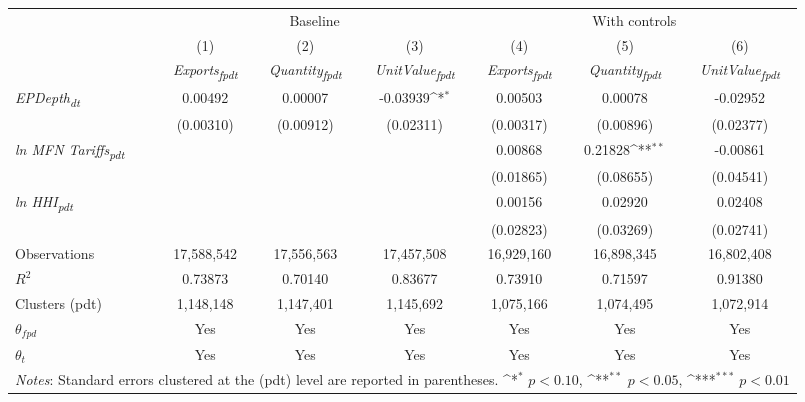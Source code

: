 {
\def\sym#1{\ifmmode^{#1}\else\(^{#1}\)\fi}
\begin{tabular}{l*{6}{c}}
\toprule
&\multicolumn{3}{c}{Baseline}&\multicolumn{3}{c}{With controls}\\\cmidrule(lr){2-4}\cmidrule(lr){5-7}
&(1)&(2)&(3)&(4)&(5)&(6)\\
&\textit{Exports\textsubscript{fpdt}}&\textit{Quantity\textsubscript{fpdt}}&\textit{UnitValue\textsubscript{fpdt}}&\textit{Exports\textsubscript{fpdt}}&\textit{Quantity\textsubscript{fpdt}}&\textit{UnitValue\textsubscript{fpdt}}\\
\midrule
\textit{EPDepth\textsubscript{dt}} & 0.00492 & 0.00007 & -0.03939\sym{*} & 0.00503 & 0.00078 & -0.02952\\
 & (0.00310) & (0.00912) & (0.02311) & (0.00317) & (0.00896) & (0.02377)\\
\addlinespace
\textit{ln MFN Tariffs\textsubscript{pdt}} &  &  &  & 0.00868 & 0.21828\sym{**} & -0.00861\\
 &  &  &  & (0.01865) & (0.08655) & (0.04541)\\
\addlinespace
\textit{ln HHI\textsubscript{pdt}} &  &  &  & 0.00156 & 0.02920 & 0.02408\\
 &  &  &  & (0.02823) & (0.03269) & (0.02741)\\
\midrule
Observations & 17,588,542 & 17,556,563 & 17,457,508 & 16,929,160 & 16,898,345 & 16,802,408\\
$R^{2}$ & 0.73873 & 0.70140 & 0.83677 & 0.73910 & 0.71597 & 0.91380\\
Clusters (pdt) & 1,148,148 & 1,147,401 & 1,145,692 & 1,075,166 & 1,074,495 & 1,072,914\\
$\theta_{fpd}$ & Yes & Yes & Yes & Yes & Yes & Yes\\
$\theta_{t}$ & Yes & Yes & Yes & Yes & Yes & Yes\\
\bottomrule
\multicolumn{7}{l}{\footnotesize \textit{Notes}: Standard errors clustered at the (pdt) level are reported in parentheses. \sym{*} \(p<0.10\), \sym{**} \(p<0.05\), \sym{***} \(p<0.01\)}\\
\end{tabular}
}
